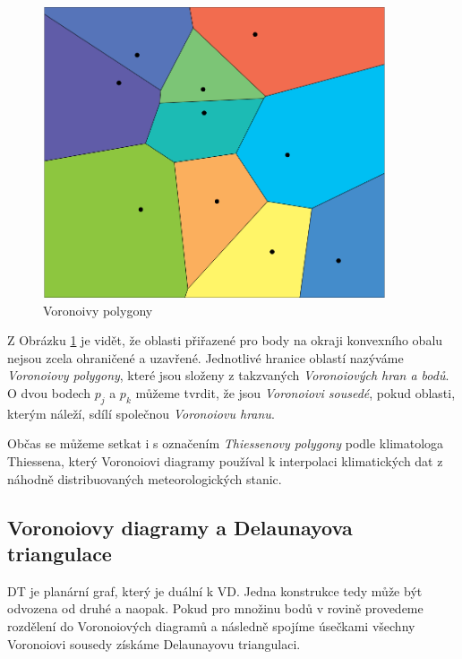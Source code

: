 \documentclass[12pt,a4paper]{article}
\begin{document}
\newpage
\begin{figure}[h!]
\centering
\includegraphics[width=0.9\textwidth]{img/vor_pol.png}
\caption{Voronoivy polygony}
\label{fig:vor_pol}
\end{figure}

Z Obrázku \ref{fig:vor_pol} je vidět, že oblasti přiřazené pro body na okraji konvexního obalu nejsou zcela ohraničené a uzavřené. Jednotlivé hranice oblastí nazýváme \emph{Voronoiovy polygony}, které jsou složeny z takzvaných \emph{Voronoiových hran a bodů}. O dvou bodech $p_j$ a $p_k$ můžeme tvrdit, že jsou \emph{Voronoiovi sousedé}, pokud oblasti, kterým náleží, sdílí společnou \emph{Voronoiovu hranu}. 

Občas se můžeme setkat i s označením \emph{Thiessenovy polygony} podle klimatologa Thiessena, který Voronoiovi diagramy používal k interpolaci klimatických dat z náhodně distribuovaných meteorologických stanic.

\newpage
\subsection{Voronoiovy diagramy a Delaunayova triangulace}

DT je planární graf, který je duální k VD. Jedna konstrukce tedy může být odvozena od druhé a naopak. 
Pokud pro množinu bodů v rovině provedeme rozdělení do Voronoiových diagramů a následně spojíme úsečkami všechny Voronoiovi sousedy získáme Delaunayovu triangulaci.
\end{document}
